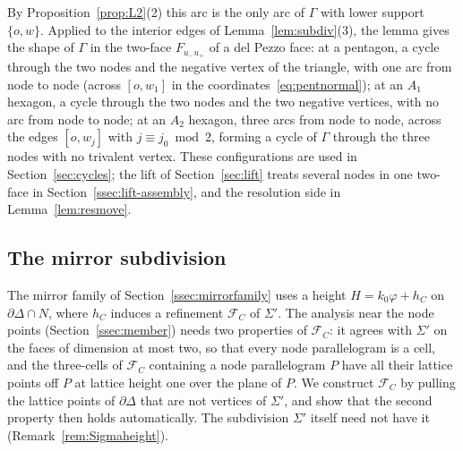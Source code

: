 By Proposition~\ref{prop:L2}(2) this arc is the only arc of $\Gamma$ with lower support $\{o,w\}$. Applied to the interior edges
of Lemma~\ref{lem:subdiv}(3), the lemma gives the shape of $\Gamma$ in the two-face $F_{u_-u_+}$ of a del Pezzo face: at a pentagon, a cycle
through the two nodes and the negative vertex of the triangle, with one arc from node to node (across $[o,w_1]$ in the
coordinates~\eqref{eq:pentnormal}); at an $A_1$ hexagon, a cycle through the two nodes and the two negative vertices, with no arc from node
to node; at an $A_2$ hexagon, three arcs from node to node, across the edges $[o,w_j]$ with $j\equiv j_0\bmod2$, forming a cycle of
$\Gamma$ through the three nodes with no trivalent vertex. These configurations are used in Section~\ref{sec:cycles}; the lift of
Section~\ref{sec:lift} treats several nodes in one two-face in Section~\ref{ssec:lift-assembly}, and the resolution side in
Lemma~\ref{lem:resmove}.

\subsection{The mirror subdivision}\label{ssec:mirrorsub}
The mirror family of Section~\ref{ssec:mirrorfamily} uses a height $H=k_0\varphi+h_C$ on $\partial\Delta\cap N$, where $h_C$ induces a
refinement $\mathcal F_C$ of $\Sigma'$. The analysis near the node points (Section~\ref{ssec:member}) needs two properties of
$\mathcal F_C$: it agrees with $\Sigma'$ on the faces of dimension at most two, so that every node parallelogram is a cell, and the
three-cells of $\mathcal F_C$ containing a node parallelogram $P$ have all their lattice points off $P$ at lattice height one over the
plane of $P$. We construct $\mathcal F_C$ by pulling the lattice points of $\partial\Delta$ that are not vertices of $\Sigma'$, and show that
the second property then holds automatically. The subdivision $\Sigma'$ itself need not have it (Remark~\ref{rem:Sigmaheight}).

